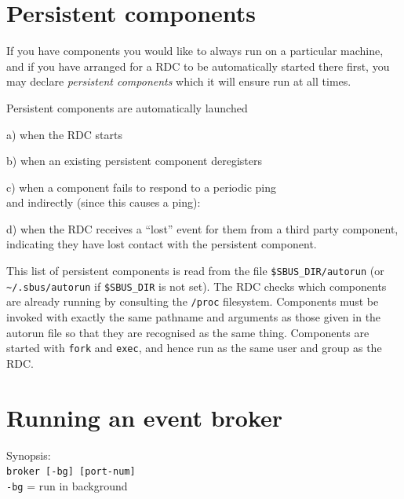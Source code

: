 \documentclass[12pt,a4paper,twoside]{article}
\renewcommand{\_}{\texttt{\symbol{95}}}
\begin{document}
\section{Persistent components}

If you have components you would like to always run on a particular
machine, and if you have arranged for a RDC to be automatically started
there first, you may declare \textit{persistent components} which it
will ensure run at all times.

Persistent components are automatically launched
\begin{numericlist}
\item [a)] when the RDC starts
\item [b)] when an existing persistent component deregisters
\item [c)] when a component fails to respond to a periodic ping\\[1mm]
	and indirectly (since this causes a ping):
\item [d)] when the RDC receives a ``lost'' event for them from
	a third party component, indicating they have lost contact with
	the persistent component.
\end{numericlist}

This list of persistent components is read from the file
\verb^$SBUS_DIR/autorun^ (or \verb^~/.sbus/autorun^ if
\verb^$SBUS_DIR^ is not set).
The RDC checks which components are already running by consulting
the \verb^/proc^ filesystem. Components must be invoked with exactly
the same pathname and arguments as those given in the autorun file
so that they are recognised as the same thing.
Components are started with \verb^fork^ and \verb^exec^, and hence
run as the same user and group as the RDC.

%
%
%

\section{Running an event broker}
\label{broker}

Synopsis:\\
\verb^broker [-bg] [port-num]^\\
\hspace*{15mm}\verb^-bg^ = run in background\\
\end{document}

